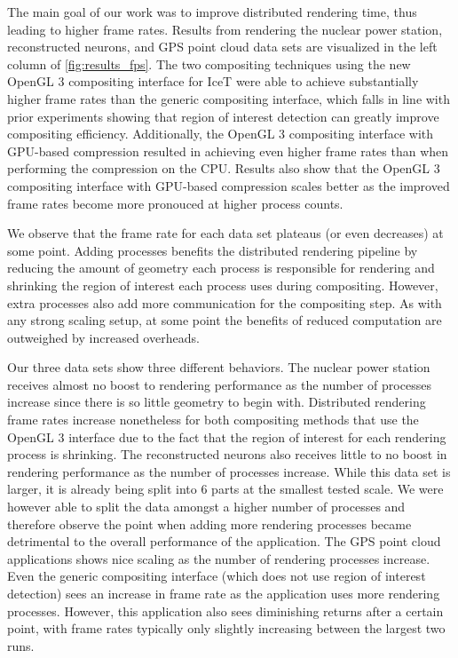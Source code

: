 \documentclass{vgtc}                          %
\begin{document}
The main goal of our work was to improve distributed rendering time, thus leading to higher frame rates. Results from rendering the nuclear power station, reconstructed neurons, and GPS point cloud data sets are visualized in the left column of \autoref{fig:results_fps}. The two compositing techniques using the new OpenGL 3 compositing interface for IceT were able to achieve substantially higher frame rates than the generic compositing interface, which falls in line with prior experiments showing that region of interest detection can greatly improve compositing efficiency. Additionally, the OpenGL 3 compositing interface with GPU-based compression resulted in achieving even higher frame rates than when performing the compression on the CPU. Results also show that the OpenGL 3 compositing interface with GPU-based compression scales better as the improved frame rates become more pronouced at higher process counts.

We observe that the frame rate for each data set plateaus (or even decreases) at some point. Adding processes benefits the distributed rendering pipeline by reducing the amount of geometry each process is responsible for rendering and shrinking the region of interest each process uses during compositing. However, extra processes also add more communication for the compositing step. As with any strong scaling setup, at some point the benefits of reduced computation are outweighed by increased overheads.

Our three data sets show three different behaviors. The nuclear power station receives almost no boost to rendering performance as the number of processes increase since there is so little geometry to begin with. Distributed rendering frame rates increase nonetheless for both compositing methods that use the OpenGL 3 interface due to the fact that the region of interest for each rendering process is shrinking. The reconstructed neurons also receives little to no boost in rendering performance as the number of processes increase. While this data set is larger, it is already being split into 6 parts at the smallest tested scale. We were however able to split the data amongst a higher number of processes and therefore observe the point when adding more rendering processes became detrimental to the overall performance of the application. The GPS point cloud applications shows nice scaling as the number of rendering processes increase. Even the generic compositing interface (which does not use region of interest detection) sees an increase in frame rate as the application uses more rendering processes. However, this application also sees diminishing returns after a certain point, with frame rates typically only slightly increasing between the largest two runs.
\end{document}
